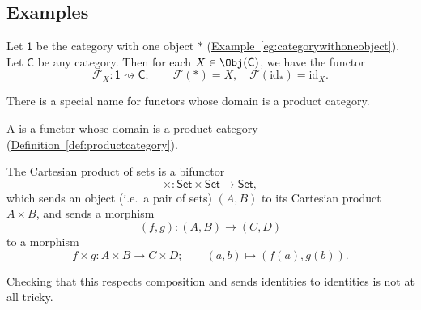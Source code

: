 \documentclass[main.tex]{subfiles}
\begin{document}
\subsection{Examples}

\begin{example}
  \label{eg:functorfrom1category}
  Let $\mathsf{1}$ be the category with one object $*$ (\hyperref[eg:categorywithoneobject]{Example~\ref*{eg:categorywithoneobject}}). Let $\mathsf{C}$ be any category. Then for each $X \in \Obj(\mathsf{C})$, we have the functor
  \begin{equation*}
    \mathcal{F}_{X}\colon \mathsf{1} \rightsquigarrow \mathsf{C};\qquad \mathcal{F}(*) = X,\quad \mathcal{F}(\mathrm{id}_{*}) = \mathrm{id}_{X}.
  \end{equation*}
\end{example}

There is a special name for functors whose domain is a product category.

\begin{definition}[bifunctor]
  \label{def:bifunctor}
  A  is a functor whose domain is a product category (\hyperref[def:productcategory]{Definition~\ref*{def:productcategory}}).
\end{definition}

\begin{example}
  \label{eg:cartesian_product_of_sets_is_bifunctor}
  The Cartesian product of sets is a bifunctor
  \begin{equation*}
    \times\colon \mathsf{Set} \times \mathsf{Set} \to \mathsf{Set},
  \end{equation*}
  which sends an object (i.e.\ a pair of sets) $(A, B)$ to its Cartesian product $A \times B$, and sends a morphism
  \begin{equation*}
    (f, g)\colon (A, B) \to (C, D)
  \end{equation*}
  to a morphism
  \begin{equation*}
    f \times g\colon A \times B \to C \times D;\qquad (a, b) \mapsto (f(a), g(b)).
  \end{equation*}

  Checking that this respects composition and sends identities to identities is not at all tricky.
\end{example}
\end{document}
